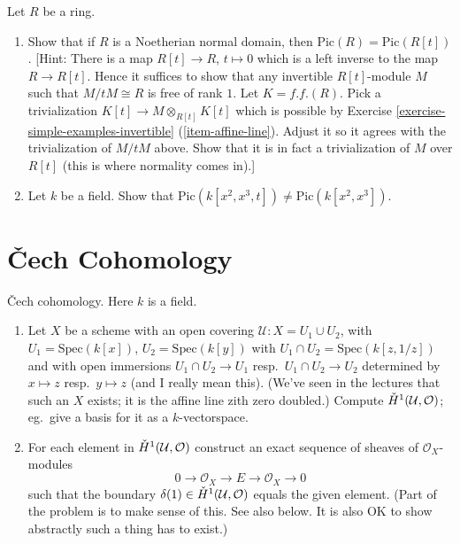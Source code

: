 \begin{exercise}
\label{exercise-traverso}
Let $R$ be a ring.
\begin{enumerate}
\item Show that if $R$ is a Noetherian normal domain, then
$\text{Pic}(R) = \text{Pic}(R[t])$. [Hint: There is a map
$R[t] \to R$, $t \mapsto 0$ which is a left inverse to the map
$R \to R[t]$. Hence it suffices to show that any invertible
$R[t]$-module $M$ such that $M/tM \cong R$ is free of rank $1$.
Let $K = f.f.(R)$.
Pick a trivialization $K[t] \to M \otimes_{R[t]} K[t]$ which is possible by
Exercise \ref{exercise-simple-examples-invertible} (\ref{item-affine-line}).
Adjust it so it agrees with the trivialization
of $M/tM$ above. Show that it is in fact a trivialization of
$M$ over $R[t]$ (this is where normality comes in).]
\item Let $k$ be a field. Show that
$\text{Pic}(k[x^2, x^3, t]) \not = \text{Pic}(k[x^2, x^3])$.
\end{enumerate}
\end{exercise}













\section{{\v C}ech Cohomology}
\label{section-cech-cohomology}

\begin{exercise}
\label{exercise-cech-cohomology}
{\v C}ech cohomology. Here $k$ is a field.
\begin{enumerate}
\item Let $X$ be a scheme with an open covering
${\mathcal U} : X = U_1 \cup U_2$, with $U_1 = \text{Spec}(k[x])$,
$U_2 =  \text{Spec}(k[y])$
with $U_1 \cap U_2 = \text{Spec}(k[z, 1/z])$ and with open immersions
$U_1 \cap U_2 \to U_1$ resp.\ $U_1 \cap U_2 \to U_2$ determined
by $x \mapsto z$ resp.\ $y \mapsto z$ (and I really mean this).
(We've seen in the lectures that such an $X$ exists; it is the affine
line zith zero doubled.) Compute ${\mathaccent 20 H}^1({\mathcal U}, {\mathcal
O})$;
eg.\ give a basis for it as a $k$-vectorspace.
\item For each element in
${\mathaccent 20 H}^1({\mathcal U}, {\mathcal O})$
construct an exact sequence of sheaves of ${\mathcal O}_X$-modules
$$
0 \to {\mathcal O}_X \to E \to {\mathcal O}_X \to 0
$$
such that the boundary $\delta(1) \in {\mathaccent 20 H}^1({\mathcal U},
{\mathcal O})$
equals the given element. (Part of the problem is to make sense of this.
See also below.
It is also OK to show abstractly such a thing has to exist.)
\end{enumerate}
\end{exercise}

